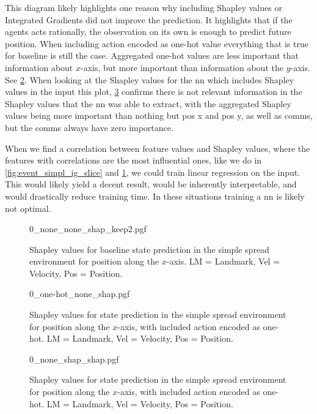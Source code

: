 \documentclass[UKenglish]{uiomasterthesis}
\begin{document}
This diagram likely highlights one reason why including Shapley values or Integrated Gradients did not improve the prediction. It highlights that if the agents acts rationally, the observation on its own is enough to predict future position. When including action encoded as one-hot value everything that is true for baseline is still the case. Aggregated one-hot values are less important that information about $x$-axis, but more important than information about the $y$-axis. See \cref{fig:state_simpl_one-hot}. When looking at the Shapley values for the \ac{nn} which includes Shapley values in the input this plot, \cref{fig:state_simpl_shap_shap} confirms there is not relevant information in the Shapley values that the \ac{nn} was able to extract, with the aggregated Shapley values being more important than nothing but pos x and pos y, as well as comms, but the comms always have zero importance.

When we find a correlation between feature values and Shapley values, where the features with correlations are the most influential ones, like we do in \cref{fig:event_simpl_ig_slice} and \cref{fig:state_simpl_shap}, we could train linear regression on the input. This would likely yield a decent result, would be inherently interpretable, and would drastically reduce training time. In these situations training a \ac{nn} is likely not optimal.

\begin{figure}[hbtp]
    \centering
{0_none_none_shap_keep2.pgf}
\caption{Shapley values for baseline state prediction in the simple spread environment for position along the $x$-axis. LM = Landmark, Vel = Velocity, Pos = Position.}
\label{fig:state_simpl_shap}
\end{figure}

\begin{figure}[hbtp]
\centering
{0_one-hot_none_shap.pgf}
\caption{Shapley values for state prediction in the simple spread environment for position along the $x$-axis, with included action encoded as one-hot. LM = Landmark, Vel = Velocity, Pos = Position.}
\label{fig:state_simpl_one-hot}
\end{figure}

\begin{figure}[hbtp]
\centering
{0_none_shap_shap.pgf}
\caption{Shapley values for state prediction in the simple spread environment for position along the $x$-axis, with included action encoded as one-hot. LM = Landmark, Vel = Velocity, Pos = Position.}
\label{fig:state_simpl_shap_shap}
\end{figure}
\end{document}
